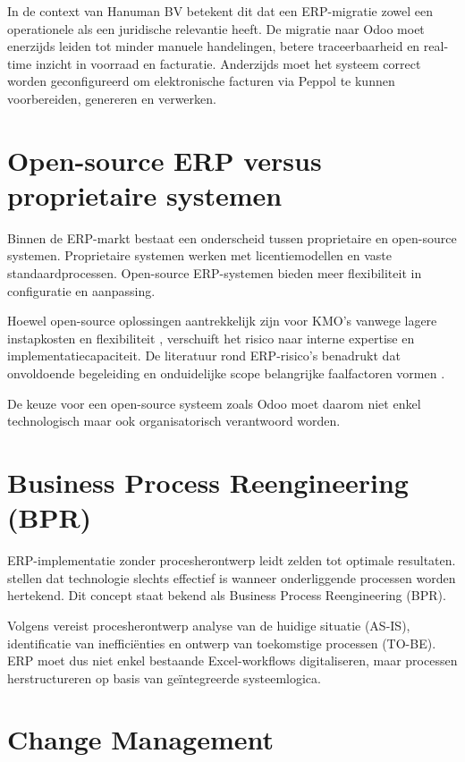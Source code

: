 In de context van Hanuman BV betekent dit dat een ERP-migratie zowel een operationele als een juridische relevantie heeft. De migratie naar Odoo moet enerzijds leiden tot minder manuele handelingen, betere traceerbaarheid en real-time inzicht in voorraad en facturatie. Anderzijds moet het systeem correct worden geconfigureerd om elektronische facturen via Peppol te kunnen voorbereiden, genereren en verwerken.

\section{Open-source ERP versus proprietaire systemen}

Binnen de ERP-markt bestaat een onderscheid tussen proprietaire en open-source systemen. Proprietaire systemen werken met licentiemodellen en vaste standaardprocessen. Open-source ERP-systemen bieden meer flexibiliteit in configuratie en aanpassing.

Hoewel open-source oplossingen aantrekkelijk zijn voor KMO’s vanwege lagere instapkosten en flexibiliteit \autocite{Haddara2011}, verschuift het risico naar interne expertise en implementatiecapaciteit. De literatuur rond ERP-risico’s benadrukt dat onvoldoende begeleiding en onduidelijke scope belangrijke faalfactoren vormen \autocite{Aloini2007}.

De keuze voor een open-source systeem zoals Odoo moet daarom niet enkel technologisch maar ook organisatorisch verantwoord worden.

\section{Business Process Reengineering (BPR)}

ERP-implementatie zonder procesherontwerp leidt zelden tot optimale resultaten. \textcite{Hammer1993} stellen dat technologie slechts effectief is wanneer onderliggende processen worden hertekend. Dit concept staat bekend als Business Process Reengineering (BPR).

Volgens \textcite{Davenport1990} vereist procesherontwerp analyse van de huidige situatie (AS-IS), identificatie van inefficiënties en ontwerp van toekomstige processen (TO-BE). ERP moet dus niet enkel bestaande Excel-workflows digitaliseren, maar processen herstructureren op basis van geïntegreerde systeemlogica.

\section{Change Management}

